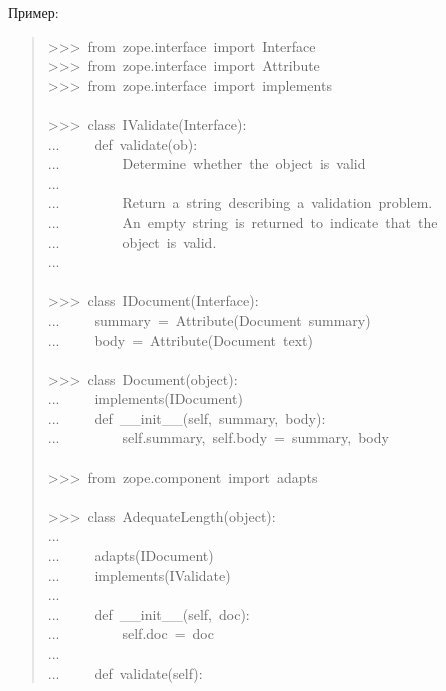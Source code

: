 \documentclass[14pt,a4paper,openany,twoside,final]{extbook}
\begin{document}
Пример:

\begin{quote}{\ttfamily \raggedright \noindent
>{}>{}>~from~zope.interface~import~Interface\\
>{}>{}>~from~zope.interface~import~Attribute\\
>{}>{}>~from~zope.interface~import~implements\\
~\\
>{}>{}>~class~IValidate(Interface):\\
...~~~~~def~validate(ob):\\
...~~~~~~~~~\textquotedbl{}\textquotedbl{}\textquotedbl{}Determine~whether~the~object~is~valid\\
...\\
...~~~~~~~~~Return~a~string~describing~a~validation~problem.\\
...~~~~~~~~~An~empty~string~is~returned~to~indicate~that~the\\
...~~~~~~~~~object~is~valid.\\
...~~~~~~~~~\textquotedbl{}\textquotedbl{}\textquotedbl{}\\
~\\
>{}>{}>~class~IDocument(Interface):\\
...~~~~~summary~=~Attribute(\textquotedbl{}Document~summary\textquotedbl{})\\
...~~~~~body~=~Attribute(\textquotedbl{}Document~text\textquotedbl{})\\
~\\
>{}>{}>~class~Document(object):\\
...~~~~~implements(IDocument)\\
...~~~~~def~\_\_init\_\_(self,~summary,~body):\\
...~~~~~~~~~self.summary,~self.body~=~summary,~body\\
~\\
>{}>{}>~from~zope.component~import~adapts\\
~\\
>{}>{}>~class~AdequateLength(object):\\
...\\
...~~~~~adapts(IDocument)\\
...~~~~~implements(IValidate)\\
...\\
...~~~~~def~\_\_init\_\_(self,~doc):\\
...~~~~~~~~~self.doc~=~doc\\
...\\
...~~~~~def~validate(self):\\
}
\end{quote}
\end{document}
